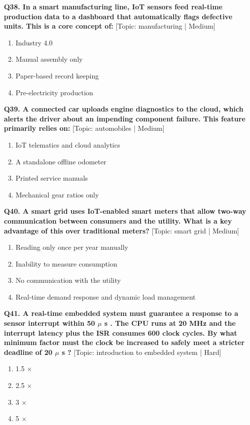 \noindent\textbf{Q38. In a smart manufacturing line, IoT sensors feed real-time production data to a dashboard that automatically flags defective units. This is a core concept of:} \hfill [Topic: manufacturing | Medium]
\begin{enumerate}[label=(\alph*),topsep=2pt,itemsep=1pt,partopsep=0pt,parsep=0pt]
    \item {Industry 4.0}
    \item {Manual assembly only}
    \item {Paper-based record keeping}
    \item {Pre-electricity production}
\end{enumerate}
\vspace{2mm}

\noindent\textbf{Q39. A connected car uploads engine diagnostics to the cloud, which alerts the driver about an impending component failure. This feature primarily relies on:} \hfill [Topic: automobiles | Medium]
\begin{enumerate}[label=(\alph*),topsep=2pt,itemsep=1pt,partopsep=0pt,parsep=0pt]
    \item {IoT telematics and cloud analytics}
    \item {A standalone offline odometer}
    \item {Printed service manuals}
    \item {Mechanical gear ratios only}
\end{enumerate}
\vspace{2mm}

\noindent\textbf{Q40. A smart grid uses IoT-enabled smart meters that allow two-way communication between consumers and the utility. What is a key advantage of this over traditional meters?} \hfill [Topic: smart grid | Medium]
\begin{enumerate}[label=(\alph*),topsep=2pt,itemsep=1pt,partopsep=0pt,parsep=0pt]
    \item {Reading only once per year manually}
    \item {Inability to measure consumption}
    \item {No communication with the utility}
    \item {Real-time demand response and dynamic load management}
\end{enumerate}
\vspace{2mm}

\noindent\textbf{Q41. A real-time embedded system must guarantee a response to a sensor interrupt within 50 $\mu$ s . The CPU runs at 20 MHz and the interrupt latency plus the ISR consumes 600 clock cycles. By what minimum factor must the clock be increased to safely meet a stricter deadline of 20 $\mu$ s ?} \hfill [Topic: introduction to embedded system | Hard]
\begin{enumerate}[label=(\alph*),topsep=2pt,itemsep=1pt,partopsep=0pt,parsep=0pt]
    \item {1.5 $\times$}
    \item {2.5 $\times$}
    \item {3 $\times$}
    \item {5 $\times$}
\end{enumerate}
\vspace{2mm}

